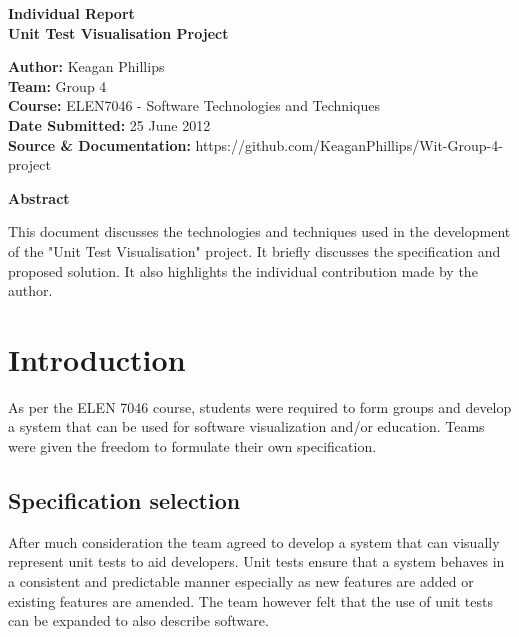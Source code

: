 \documentclass[a4paper,12pt]{article}
\begin{document}
\begin{center}
\begin{Huge}
\textbf{{\LARGE Individual Report \\ Unit Test Visualisation Project }}
\linebreak
\linebreak
\linebreak
\linebreak
\end{Huge}\end{center}




\begin{small}
\begin{flushleft}
\textbf{Author:} Keagan Phillips
\\
\textbf{Team:} Group 4
\\
\textbf{Course:} ELEN7046 - Software Technologies and Techniques
\\
\textbf{Date Submitted:} 25 June 2012
\\
\textbf{Source \& Documentation:} https://github.com/KeaganPhillips/Wit-Group-4-project
\linebreak
\linebreak
\linebreak
\linebreak
\linebreak
\end{flushleft}

\end{small}


\begin{flushleft}
\textbf{{\large Abstract}}
\end{flushleft}
This document discusses the technologies and techniques used in the development of the "Unit Test Visualisation" project. It briefly discusses the specification and proposed solution. It also highlights the individual contribution  made by the author.    
\clearpage


\tableofcontents


\clearpage

\section{Introduction}
As per the ELEN 7046 course, students were required to form groups and develop a system that can be used for software visualization and/or education. Teams were given the freedom to formulate their own specification.

\subsection{Specification selection}
After much consideration the team agreed to develop a system that can visually represent unit tests to aid developers. Unit tests ensure that a system behaves in a consistent and predictable manner especially as new features are added or existing features are amended. The team however felt that the use of unit tests can be expanded to also describe software.  
\end{document}

